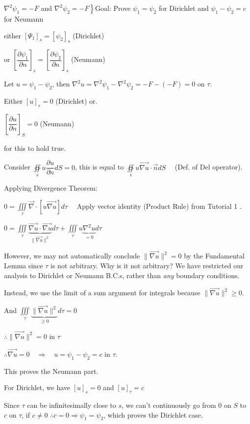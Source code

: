 \documentclass{report}
\begin{document}
$\nabla^{2} \psi_{1}=-F$ and $\left.\nabla^{2} \psi_{2}=-F\right\}$\qquad Goal: Prove $\psi_{1}=\psi_{2}$ for Dirichlet and $\psi_{1}-\psi_{2}=c$ for Neumann

either $\left[\Psi_{1}\right]_{s}=\left[\psi_{2}\right]_{s}$ (Dirichlet) 

or $\left[\dfrac{\partial \psi_{1}}{\partial n}\right]_{s}=\left[\dfrac{\partial \psi_{2}}{\partial n}\right]_{s}$ (Neumann)

Let $u=\psi_{1}-\psi_{2}$, then $\nabla^{2} u=\nabla^{2} \psi_{1}-\nabla^{2} \psi_{2}=-F-(-F)=0$ on $\tau.$

Either $[u]_{s}=0$ (Dirichlet) 
or. 

$\left[\dfrac{\partial u}{\partial n}\right]_{S}=0$ (Neumann)

for this to hold true.

Consider $\oiint\limits_{s} u \dfrac{\partial u}{\partial n} d S=0$, this is equal to $\oiint\limits_{s} u \overrightarrow{\nabla u} \cdot \vec{n} d S \quad$ (Def. of Del operator).

Applying Divergence Theorem:

$0=\iiint\limits_{\tau} \vec{\nabla} \cdot[u \overrightarrow{\nabla u}] d \tau \quad$ Apply vector identity (Product Rule) from Tutorial 1 .


$0=\iiint\limits_{\tau} \underbrace{\overrightarrow{\nabla u} \cdot \overrightarrow{\nabla u}}_{\|\overrightarrow{\nabla u}\|^{2}} d \tau+\iiint\limits_{\tau} u \underbrace{\nabla^{2} u}_{=0} d \tau
$

However, we may not automatically conclude $\|\overrightarrow{\nabla u}\|^{2}=0$ by the Fundamental Lemma since $\tau$ is not arbitrary. Why is it not arbitrary? We have restricted our analysis to Dirichlet or Neumann B.C.s, rather than \textit{any} boundary conditions. 

Instead, we use the limit of a sum argument for integrals because $\|\overrightarrow{\nabla u}\|^{2} \geqslant 0$.

And $\iiint\limits_{\tau} \underbrace{\|\vec{\nabla u}\|^{2}}_{\geq 0} d \tau=0 \quad$ 

$\therefore\|\overrightarrow{\nabla u}\|^2=0$ in $\tau$

$\therefore\overrightarrow{\nabla u}=0\quad\Rightarrow\quad u=\psi_1-\psi_2=c$ in $\tau$.

This proves the Neumann part.

For Dirichlet, we have $[u]_{s}=0$ and $[u]_{\tau}=c$

Since $\tau$ can be infinitesimally close to $s$, we can't continuously go from 0 on $S$ to $c$ on $\tau$, if $c \neq 0$ $\therefore c=0 \Rightarrow \psi_{1}=\psi_{2}$, which proves the Dirichlet case.
\end{document}
